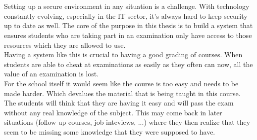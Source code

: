 
%
%

%



\chapter*{}
Setting up a secure environment in any situation is a challenge. With technology constantly evolving, especially in the IT sector, it's always hard to keep security up to date as well. The core of  the purpose in this thesis is to build a system that ensures students who are taking part in an examination only have access to those resources which they are allowed to use. \\ Having a system like this is crucial to having a good grading of courses. When students are able to cheat at examinations as easily as they often can now, all the value of an examination is lost.\\ For the school itself it would seem like the course is too easy and needs to be made harder. Which devalues the material that is being taught in this course.  \\
The students will think that they are having it easy and will pass the exam without any real knowledge of the subject. This may come back in later situations (follow up courses, job inteviews, ...) where they then realize that they seem to be missing some knowledge that they were supposed to have.\\
